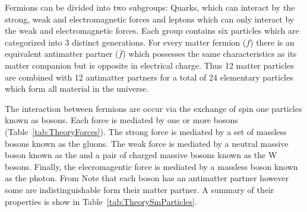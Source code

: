 Fermions can be divided into two subgroups: Quarks, which can interact by the strong, weak and electromagnetic forces and leptons which can only interact by the weak and electromagnetic forces. Each group contains six particles which are categorized into 3 distinct generations. For every matter fermion ($f$) there is an equivalent antimatter partner ($\bar{f}$) which possesses the same characteristics as its matter companion but is opposite in electrical charge. Thus 12 matter particles are combined with 12 antimatter partners for a total of 24 elementary particles which form all material in the universe.

The interaction between fermions are occur via the exchange of spin one particles known as bosons. Each force is mediated by one or more bosons (Table~\ref{tab:TheoryForces}). The strong force is mediated by a set of massless bosons known as the gluons. The weak force is mediated by a neutral massive boson known as the \ZbosonText{} and a pair of charged massive bosons known as the W bosons. Finally, the elecromagentic force is mediated by a massless boson known as the photon. From Note that each boson has an antimatter partner however some are indistinguishable form their matter partner. A summary of their properties is show in Table~\ref{tab:TheorySmParticles}.

